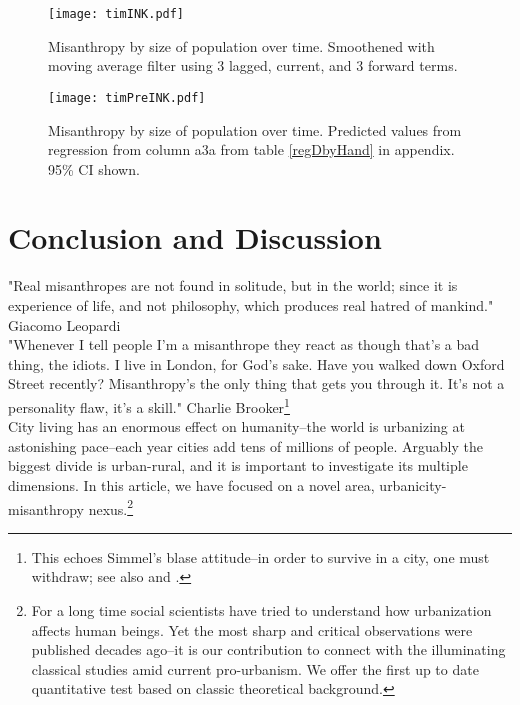 \documentclass[10pt, letterpaper]{article}
\begin{document}
\begin{spacing}{1.4}
\begin{figure}[H]
  \texttt{[image: timINK.pdf]}\centering
\caption{Misanthropy by size of population over time. Smoothened with moving
  average filter using 3 lagged, current, and 3 forward terms.}\label{tim}%
\end{figure}



\begin{figure}[H]
  \texttt{[image: timPreINK.pdf]}\centering
\caption{Misanthropy by size of population over time. Predicted values from regression from column a3a
from table \ref{regDbyHand} in appendix. 95\% CI shown.}\label{timPre}%
\end{figure}



\section*{Conclusion and Discussion}

\noindent "Real misanthropes are not found in solitude, but in the world; since
it is experience of life, and not philosophy, which produces real hatred of
mankind." Giacomo Leopardi\\

\noindent "Whenever I tell people I'm a misanthrope they react as though that's a bad thing, the idiots. I live in London, for God's sake. Have you walked down Oxford Street recently? Misanthropy's the only thing that gets you through it. It's not a personality flaw, it's a skill." Charlie Brooker\footnote{This echoes Simmel's blase attitude--in order to survive in a city, one must withdraw; see also \citet{milgram70} and \citet{lederbogen11}.}\\

City living has an enormous effect on humanity--the world is urbanizing at
astonishing pace--each year cities add tens of millions of people. Arguably
the biggest divide is urban-rural, and it is important to investigate its
multiple dimensions. In this article, we have focused on a novel area,
urbanicity-misanthropy nexus.\footnote{For a long time social scientists have
  tried to understand how urbanization affects human beings. Yet the most sharp
  and critical observations were published decades ago--it is our contribution
  to connect with the illuminating classical studies amid current
  pro-urbanism. We offer the first up to date quantitative test based  on classic theoretical background. %
}   
 

\end{spacing}
\end{document}
